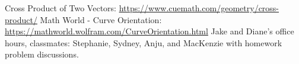 \documentclass [12pt]{article}
\begin{document}
\begin{thebibliography}{1}
Cross Product of Two Vectors: \url{https://www.cuemath.com/geometry/cross-product/}
Math World - Curve Orientation: \url{https://mathworld.wolfram.com/CurveOrientation.html}
Jake and Diane's office hours, classmates: Stephanie, Sydney, Anju, and MacKenzie with homework problem discussions.
\end{thebibliography}
\end{document}
